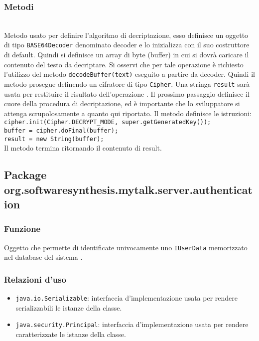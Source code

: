 \subsubsection*{Metodi}
\begin{description}

	\item{}\\
	Metodo usato per definire l'algoritmo di decriptazione, esso definisce un oggetto di tipo \texttt{BASE64Decoder} denominato decoder e lo inizializza con il suo costruttore di default. Quindi si definisce un array di byte (buffer) in cui si dovrà caricare il contenuto del testo da decriptare. Si osservi che per tale operazione è richiesto l'utilizzo del metodo \texttt{decodeBuffer(text)} eseguito a partire da decoder. Quindi il metodo prosegue definendo  un cifratore di tipo \texttt{Cipher}. Una stringa \texttt{result} sarà usata per restituire il risultato dell'operazione . Il prossimo passaggio definisce il cuore della procedura di decriptazione, ed è importante che lo sviluppatore si attenga scrupolosamente a quanto qui riportato. Il metodo definisce le istruzioni:\\
	
	\verb|cipher.init(Cipher.DECRYPT_MODE, super.getGeneratedKey());|\\
	\verb|buffer = cipher.doFinal(buffer);|\\
	\verb|result = new String(buffer);|\\
	
	Il metodo termina ritornando il contenuto di result.
	
\end{description}

\subsection{Package org.softwaresynthesis.mytalk.server.authentication}\label{sec:authentication}


\subsubsection*{Funzione}
Oggetto che permette di identificate univocamente uno \texttt{IUserData} memorizzato nel database del sistema \caName.

\subsubsection*{Relazioni d'uso}
\begin{itemize}
	\item \texttt{java.io.Serializable}: interfaccia d'implementazione usata per rendere serializzabili le istanze della classe.
	\item \texttt{java.security.Principal}: interfaccia d'implementazione usata per rendere caratterizzate le istanze della classe.
\end{itemize}

